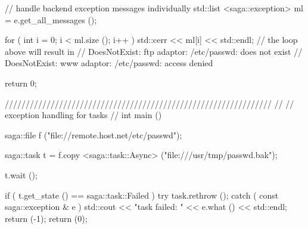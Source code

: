 \begin{mycode}
{{       // handle backend exception messages individually
       std::list <saga::exception> ml = e.get_all_messages ();

       for ( int i = 0; i < ml.size (); i++ )
       {
         std::cerr << ml[i] << std::endl;
       }
       // the loop above will result in
       // DoesNotExist: ftp adaptor: /etc/passwd: does not exist
       // DoesNotExist: www adaptor: /etc/passwd: access denied
    }

    return 0;
  }
         
 
  ////////////////////////////////////////////////////////////////
  // 
  // exception handling for tasks
  //
  int main ()
  {
    saga::file f ("file://remote.host.net/etc/passwd");
 
    saga::task t = f.copy <saga::task::Async> 
                           ("file:///usr/tmp/passwd.bak");
 
    t.wait ();
 
    if ( t.get_state () == saga::task::Failed )
    {
      try {
        task.rethrow ();
      }
      catch ( const saga::exception & e )
      {
        std::cout << "task failed: " 
                  << e.what () 
                  << std::endl;
      }
      return (-1);
    }
    return (0);
  }
 \end{mycode}
 
 
 
 
